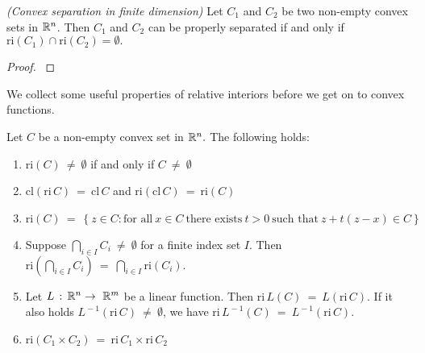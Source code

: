 \begin{ftheorem}
  \label{cv:primer:sep}
  \emph{(Convex separation in finite dimension)}
  Let $C_1$ and $C_2$ be two non-empty convex sets in $\mathbb{R}^n$. 
  Then $C_1$ and $C_2$ can be properly separated if and only if 
  $\mathrm{ri}(C_1)\cap\mathrm{ri}(C_2)=\emptyset.$
\end{ftheorem}
\begin{proof}
  \cite[Theorem~11.3]{Rockafellar1970}
\end{proof}
We collect some useful 
properties of relative interiors
before we get on to convex functions.
\begin{proposition}
  \label{cv:primer:prop}
  Let $C$ be a non-empty convex set in $\mathbb{R}^n.$ The following holds:
\begin{enumerate}[label={(\roman*)}]
  \item
    $
      \mathrm{ri}(C)
      \ 
      \neq
      \ 
      \emptyset
      $
if and only if
      $
      C
      \ 
      \neq
      \ 
      \emptyset
    $
  \item
    $
      \mathrm{cl}(\mathrm{ri}\,C)
      \ 
      =
      \ 
      \mathrm{cl}\,C
      $
      and
      $
      \mathrm{ri}(\mathrm{cl}\,C)
      \ 
      =
      \ 
      \mathrm{ri}(C)
    $
  \item
    $
    \mathrm{ri}(C)
      \ 
    =
      \ 
    \left\{ 
      z \in C
      \colon
      \text{for all}\ 
      x \in C \ 
      \text{there exists}\ 
      t > 0 \ 
      \text{such that}\ 
      z + t (z-x)
      \in C
    \right\}
    $
  \item
    Suppose
    $
      \bigcap_{i\in I} C_i
      \ 
      \neq
      \ 
      \emptyset
    $
    for a finite index set $I$.
    Then
    $
      \mathrm{ri}
      \left( 
        \bigcap_{i\in I} C_i
      \right)
      \ 
      =
      \ 
      \bigcap_{i\in I}  
      \mathrm{ri}(C_i)
    $.
    \item
      Let 
      $
        L\,:\,\mathbb{R}^n \to\  \mathbb{R}^m
      $
      be a linear function. Then
      $
        \mathrm{ri}\,L(C)
        \ 
        =
        \ 
        L(\mathrm{ri}\,C)
      $.
      If it also holds
      $
        L^{\!-1}(\mathrm{ri}\,C)
        \ 
        \neq
        \ 
        \emptyset
      $,
      we have
      $
      \mathrm{ri}\,L^{\!-1}(C)
      \ 
        =
      \ 
        L^{\!-1}(\mathrm{ri}\,C)
      $.
      \item
        $
          \mathrm{ri}(C_1\!\times C_2)
          \ 
          = 
          \ 
          \mathrm{ri}\,C_1
          \! 
          \times
          \mathrm{ri}\,C_2
        $
\end{enumerate}

\end{proposition}


